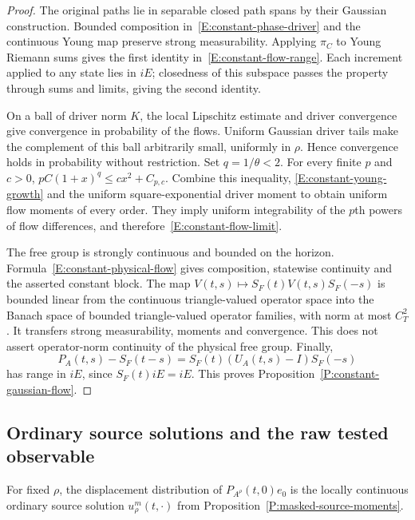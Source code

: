 \begin{proof}
  The original paths lie in separable closed path spans by their Gaussian
  construction. Bounded composition in~\eqref{E:constant-phase-driver}
  and the continuous Young map preserve strong measurability.
  Applying $\pi_C$ to Young Riemann sums gives the first identity
  in~\eqref{E:constant-flow-range}. Each increment applied to any
  state lies in $iE$; closedness of this subspace passes the property
  through sums and limits, giving the second identity.

  On a ball of driver norm $K$, the local Lipschitz estimate and driver
  convergence give convergence in probability of the flows. Uniform
  Gaussian driver tails make the complement of this ball arbitrarily
  small, uniformly in $\rho$. Hence convergence holds in probability
  without restriction. Set $q=1/\theta<2$. For every finite $p$ and
  $c>0$, $pC(1+x)^q\le cx^2+C_{p,c}$. Combine this inequality,
  \eqref{E:constant-young-growth} and the uniform square-exponential
  driver moment to obtain uniform flow moments of every order.
  They imply uniform integrability of the $p$th powers of flow
  differences, and therefore~\eqref{E:constant-flow-limit}.

  The free group is strongly continuous and bounded on the horizon.
  Formula~\eqref{E:constant-physical-flow} gives composition, statewise
  continuity and the asserted constant block. The map
  $V(t,s)\mapsto S_F(t)V(t,s)S_F(-s)$ is bounded linear from the
  continuous triangle-valued operator space into the Banach space
  of bounded triangle-valued operator families, with norm at most
  $C_T^2$. It transfers strong measurability, moments and convergence.
  This does not assert operator-norm continuity of the physical free
  group. Finally,
  \[
    P_A(t,s)-S_F(t-s)
    =S_F(t)(U_A(t,s)-I)S_F(-s)
  \]
  has range in $iE$, since $S_F(t)iE=iE$.
  This proves Proposition~\ref{P:constant-gaussian-flow}.
\end{proof}

\subsection{Ordinary source solutions and the raw tested observable}

\begin{lemma}
  \label{L:constant-source-solution}
  For fixed $\rho$, the displacement distribution of
  $P_{A^\rho}(t,0)e_0$ is the locally continuous ordinary source solution
  $u_\rho^m(t,\cdot)$ from Proposition~\ref{P:masked-source-moments}.
\end{lemma}

